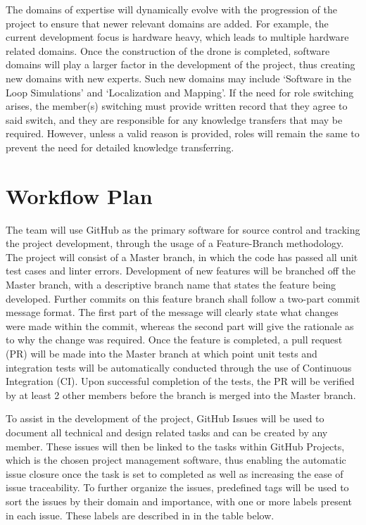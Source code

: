 \documentclass{article}
\begin{document}
The domains of expertise will dynamically evolve with the progression of the project to ensure that newer relevant domains are added. For example, the current development focus is hardware heavy, which leads to multiple hardware related domains. Once the construction of the drone is completed, software domains will play a larger factor in the development of the project, thus creating new domains with new experts. Such new domains may include ‘Software in the Loop Simulations’ and ‘Localization and Mapping’. If the need for role switching arises, the member(s) switching must provide written record that they agree to said switch, and they are responsible for any knowledge transfers that may be required. However, unless a valid reason is provided, roles will remain the same to prevent the need for detailed knowledge transferring. 
\newpage

\section{Workflow Plan}

The team will use GitHub as the primary software for source control and tracking the project development, through the usage of a Feature-Branch methodology. The project will consist of a Master branch, in which the code has passed all unit test cases and linter errors. Development of new features will be branched off the Master branch, with a descriptive branch name that states the feature being developed. Further commits on this feature branch shall follow a two-part commit message format. The first part of the message will clearly state what changes were made within the commit, whereas the second part will give the rationale as to why the change was required. Once the feature is completed, a pull request (PR) will be made into the Master branch at which point unit tests and integration tests will be automatically conducted through the use of Continuous Integration (CI). Upon successful completion of the tests, the PR will be verified by at least 2 other members before the branch is merged into the Master branch.  

To assist in the development of the project, GitHub Issues will be used to document all technical and design related tasks and can be created by any member. These issues will then be linked to the tasks within GitHub Projects, which is the chosen project management software, thus enabling the automatic issue closure once the task is set to completed as well as increasing the ease of issue traceability. To further organize the issues, predefined tags will be used to sort the issues by their domain and importance, with one or more labels present in each issue. These labels are described in in the table below. 
\end{document}
